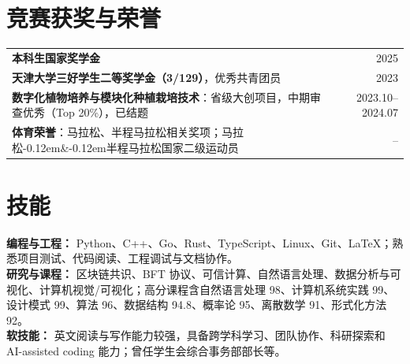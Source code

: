 \documentclass[9pt,a4paper]{article}
\begin{document}
\section{竞赛获奖与荣誉}
\noindent\colorbox{paperblue}{%
  \begin{minipage}{\dimexpr\linewidth-2\fboxsep\relax}
    \begin{tabularx}{\linewidth}{@{}X r@{}}
    \textbf{本科生国家奖学金} & 2025\\
    \textbf{天津大学三好学生二等奖学金（3/129）}，优秀共青团员 & 2023\\
    \textbf{数字化植物培养与模块化种植栽培技术}：省级大创项目，中期审查优秀（Top 20\%），已结题 & 2023.10--2024.07\\
    \textbf{体育荣誉}：马拉松、半程马拉松相关奖项；马拉松\kern-0.12em\&\kern-0.12em半程马拉松国家二级运动员 & --\\
    \end{tabularx}
  \end{minipage}%
}

\section{技能}
\textbf{编程与工程：} Python、C++、Go、Rust、TypeScript、Linux、Git、LaTeX；熟悉项目测试、代码阅读、工程调试与文档协作。\\
\textbf{研究与课程：} 区块链共识、BFT 协议、可信计算、自然语言处理、数据分析与可视化、计算机视觉/可视化；高分课程含自然语言处理 98、计算机系统实践 99、设计模式 99、算法 96、数据结构 94.8、概率论 95、离散数学 91、形式化方法 92。\\
\textbf{软技能：} 英文阅读与写作能力较强，具备跨学科学习、团队协作、科研探索和 AI-assisted coding 能力；曾任学生会综合事务部部长等。
\end{document}
